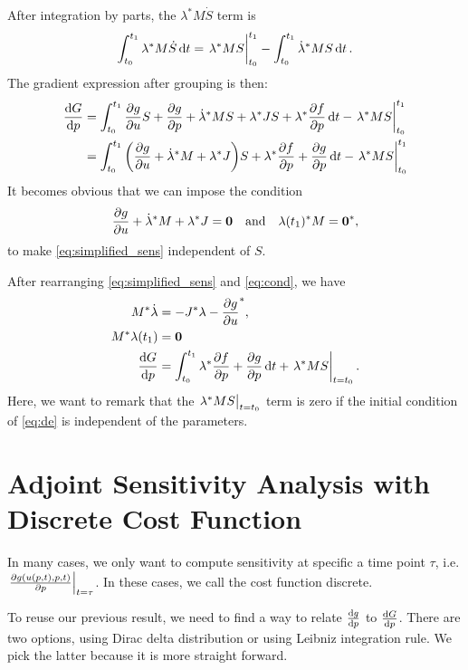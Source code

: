 \documentclass[a4paper,9pt]{article}
\theoremstyle{definition}
\theoremstyle{remark}
\begin{document}
After integration by parts, the $\lambda^* M\dot{S}$ term is
\begin{align}
  \int_{t_0}^{t_1} \lambda^* M\dot{S} \dd{t} = \eval{\lambda^* MS}_{t_0}^{t_1} -
  \int_{t_0}^{t_1} \dot{\lambda}^* MS \dd{t}.
\end{align}
The gradient expression after grouping is then:
\begin{align} \label{eq:simplified_sens}
  \dv{G}{p} &= \int_{t_0}^{t_1} \pdv{g}{u}S + \pdv{g}{p}
  + \dot{\lambda}^* MS + \lambda^* JS+ \lambda^* \pdv{f}{p} \dd{t}
              - \eval{\lambda^* MS}_{t_0}^{t_1} \nonumber \\
            &= \int_{t_0}^{t_1} \qty(\pdv{g}{u} + \dot{\lambda}^*M  + \lambda^*
            J)S +\lambda^* \pdv{f}{p}  + \pdv{g}{p} \dd{t}
              - \eval{\lambda^* MS}_{t_0}^{t_1}
\end{align}
It becomes obvious that we can impose the condition
\begin{equation} \label{eq:cond}
  \pdv{g}{u} + \dot{\lambda}^*M + \lambda^* J = \bm{0} \qq{and}
  \lambda(t_1)^* M = \bm{0}^*,
\end{equation}
to make \cref{eq:simplified_sens} independent of $S$.

After rearranging \cref{eq:simplified_sens} and \cref{eq:cond}, we have
\begin{align}
    M^*\dot{\lambda} &= -J^* \lambda - \pdv{g}{u}^*, \label{eq:adj_eq_cont}\\
    M^* \lambda(t_1) &= \bm{0} \label{eq:init_cont}\\
    \dv{G}{p} &= \int_{t_0}^{t_1} \lambda^* \pdv{f}{p}  + \pdv{g}{p} \dd{t}
    + \eval{\lambda^* MS}_{t=t_0}. \label{eq:sens_int}
\end{align}
Here, we want to remark that the $\eval{\lambda^* MS}_{t=t_0}$ term is zero if
the initial condition of \cref{eq:de} is independent of the parameters.

\section{Adjoint Sensitivity Analysis with Discrete Cost Function}
In many cases, we only want to compute sensitivity at specific a time point
$\tau$, i.e. $\eval{\pdv{g(u(p, t), p, t)}{p}}_{t=\tau}$. In these cases, we
call the cost function discrete.

To reuse our previous result, we need to find a way to relate $\dv{g}{p}$ to
$\dv{G}{p}$. There are two options, using Dirac delta distribution or using
Leibniz integration rule. We pick the latter because it is more straight
forward.
\end{document}
